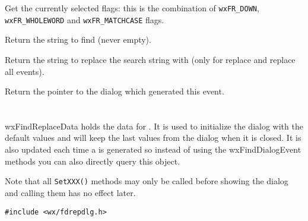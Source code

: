 \label{wxfinddialogeventgetflags}


Get the currently selected flags: this is the combination of {\tt wxFR\_DOWN},
{\tt wxFR\_WHOLEWORD} and {\tt wxFR\_MATCHCASE} flags.

\label{wxfinddialogeventgetfindstring}


Return the string to find (never empty).

\label{wxfinddialogeventgetreplacestring}


Return the string to replace the search string with (only for replace and
replace all events).

\label{wxfinddialogeventgetdialog}


Return the pointer to the dialog which generated this event.

\section{}\label{wxfindreplacedata}

wxFindReplaceData holds the data for 
. It is used to initialize
the dialog with the default values and will keep the last values from the
dialog when it is closed. It is also updated each time a 
 is generated so instead of
using the wxFindDialogEvent methods you can also directly query this object.

Note that all {\tt SetXXX()} methods may only be called before showing the
dialog and calling them has no effect later.


\begin{verbatim}
#include <wx/fdrepdlg.h>
\end{verbatim}




